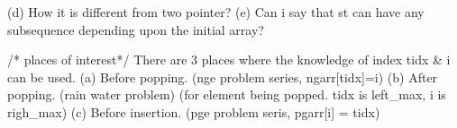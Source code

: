 \begin{solution}[Stack | $O(n)$]
\begin{fullwidth}
\begin{code3}
    (d) How it is different from two pointer?
    (e) Can i say that st can have any subsequence depending upon the initial array? 

    /* places of interest*/
    There are 3 places where the knowledge of index tidx & i can be used.
    (a) Before popping. (nge problem series, ngarr[tidx]=i)
    (b) After popping. (rain water problem) (for element being popped. tidx is left_max, i is righ_max)
    (c) Before insertion.  (pge problem seris, pgarr[i] = tidx)

    \end{code3}
\end{fullwidth}
\lipsum[1-4]
\end{solution}